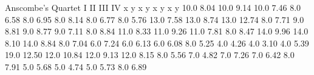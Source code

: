 Anscombe's Quartet
I	II	III	IV
x	y	x	y	x	y	x	y
10.0	8.04	10.0	9.14	10.0	7.46	8.0	6.58
8.0	6.95	8.0	8.14	8.0	6.77	8.0	5.76
13.0	7.58	13.0	8.74	13.0	12.74	8.0	7.71
9.0	8.81	9.0	8.77	9.0	7.11	8.0	8.84
11.0	8.33	11.0	9.26	11.0	7.81	8.0	8.47
14.0	9.96	14.0	8.10	14.0	8.84	8.0	7.04
6.0	7.24	6.0	6.13	6.0	6.08	8.0	5.25
4.0	4.26	4.0	3.10	4.0	5.39	19.0	12.50
12.0	10.84	12.0	9.13	12.0	8.15	8.0	5.56
7.0	4.82	7.0	7.26	7.0	6.42	8.0	7.91
5.0	5.68	5.0	4.74	5.0	5.73	8.0	6.89



